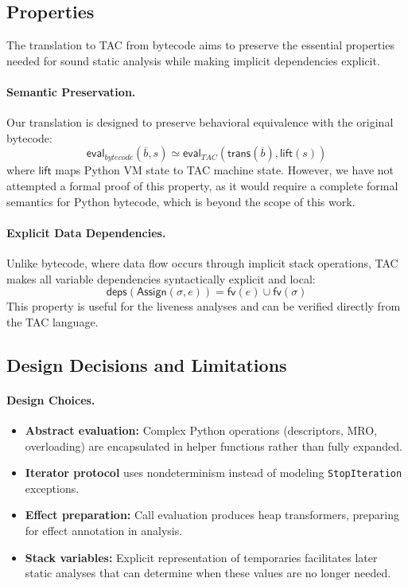 \subsection{Properties}

The translation to TAC from bytecode aims to preserve the essential properties needed for sound static analysis while making implicit dependencies explicit.

\paragraph{Semantic Preservation.}
Our translation is designed to preserve behavioral equivalence with the original bytecode:
\[
\mathsf{eval}_{bytecode}(\overline{b}, s) \simeq \mathsf{eval}_{TAC}(\mathsf{trans}(\overline{b}), \mathsf{lift}(s))
\]
where $\mathsf{lift}$ maps Python VM state to TAC machine state. However, we have not attempted a formal proof of this property, as it would require a complete formal semantics for Python bytecode, which is beyond the scope of this work.

\paragraph{Explicit Data Dependencies.}
Unlike bytecode, where data flow occurs through implicit stack operations, TAC makes all variable dependencies syntactically explicit and local:
\[
\mathsf{deps}(\mathsf{Assign}(\sigma, e)) = \mathsf{fv}(e) \cup \mathsf{fv}(\sigma)
\]
This property is useful for the liveness analyses and can be verified directly from the TAC language.

\subsection{Design Decisions and Limitations}

\paragraph{Design Choices.}
\begin{itemize}
\item \textbf{Abstract evaluation:} Complex Python operations (descriptors, MRO, overloading) are encapsulated in helper functions rather than fully expanded.
\item \textbf{Iterator protocol} uses nondeterminism instead of modeling \texttt{StopIteration} exceptions.
\item \textbf{Effect preparation:} Call evaluation produces heap transformers, preparing for effect annotation in analysis.
\item \textbf{Stack variables:} Explicit representation of temporaries facilitates later static analyses that can determine when these values are no longer needed.
\end{itemize}

